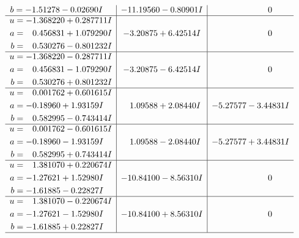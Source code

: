 \documentclass[1p]{elsarticle_modified}
\theoremstyle{definition}
\begin{document}
$$\begin{array}{c|c|c}
\begin{aligned}
b &= -1.51278 - 0.02690 I\end{aligned}
 & -11.19560 - 0.80901 I & \phantom{-0.000000 } 0 \\ \hline\begin{aligned}
u &= -1.368220 + 0.287711 I \\
a &= \phantom{-}0.456831 + 1.079290 I \\
b &= \phantom{-}0.530276 - 0.801232 I\end{aligned}
 & -3.20875 + 6.42514 I & \phantom{-0.000000 } 0 \\ \hline\begin{aligned}
u &= -1.368220 - 0.287711 I \\
a &= \phantom{-}0.456831 - 1.079290 I \\
b &= \phantom{-}0.530276 + 0.801232 I\end{aligned}
 & -3.20875 - 6.42514 I & \phantom{-0.000000 } 0 \\ \hline\begin{aligned}
u &= \phantom{-}0.001762 + 0.601615 I \\
a &= -0.18960 + 1.93159 I \\
b &= \phantom{-}0.582995 - 0.743414 I\end{aligned}
 & \phantom{-}1.09588 + 2.08440 I & -5.27577 - 3.44831 I \\ \hline\begin{aligned}
u &= \phantom{-}0.001762 - 0.601615 I \\
a &= -0.18960 - 1.93159 I \\
b &= \phantom{-}0.582995 + 0.743414 I\end{aligned}
 & \phantom{-}1.09588 - 2.08440 I & -5.27577 + 3.44831 I \\ \hline\begin{aligned}
u &= \phantom{-}1.381070 + 0.220674 I \\
a &= -1.27621 + 1.52980 I \\
b &= -1.61885 - 0.22827 I\end{aligned}
 & -10.84100 - 8.56310 I & \phantom{-0.000000 } 0 \\ \hline\begin{aligned}
u &= \phantom{-}1.381070 - 0.220674 I \\
a &= -1.27621 - 1.52980 I \\
b &= -1.61885 + 0.22827 I\end{aligned}
 & -10.84100 + 8.56310 I & \phantom{-0.000000 } 0\\
 \hline 
 \end{array}$$\newpage$$\begin{array}{c|c|c}  

\end{array}$$
\end{document}
